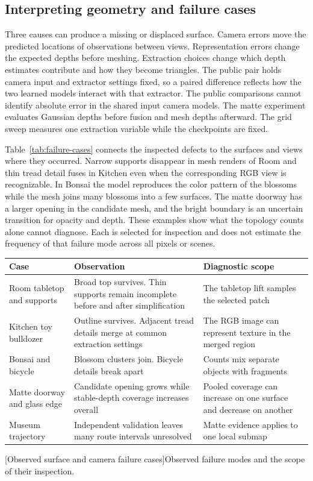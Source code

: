 \subsection{Interpreting geometry and failure cases}
Three causes can produce a missing or displaced surface. Camera errors move the predicted locations of observations between views. Representation errors change the expected depths before meshing. Extraction choices change which depth estimates contribute and how they become triangles. The public pair holds camera input and extractor settings fixed, so a paired difference reflects how the two learned models interact with that extractor. The public comparisons cannot identify absolute error in the shared input camera models. The matte experiment evaluates Gaussian depths before fusion and mesh depths afterward. The grid sweep measures one extraction variable while the checkpoints are fixed.

Table~\ref{tab:failure-cases} connects the inspected defects to the surfaces and views where they occurred. Narrow supports disappear in mesh renders of Room and thin tread detail fuses in Kitchen even when the corresponding RGB view is recognizable. In Bonsai the model reproduces the color pattern of the blossoms while the mesh joins many blossoms into a few surfaces. The matte doorway has a larger opening in the candidate mesh, and the bright boundary is an uncertain transition for opacity and depth. These examples show what the topology counts alone cannot diagnose. Each is selected for inspection and does not estimate the frequency of that failure mode across all pixels or scenes.

\begin{center}\begin{minipage}{\linewidth}
\small\begin{tabularx}{\linewidth}{@{}p{.23\linewidth}YY@{}}
\toprule
\textbf{Case} & \textbf{Observation} & \textbf{Diagnostic scope}\\
\midrule
Room tabletop and supports & Broad top survives. Thin supports remain incomplete before and after simplification & The tabletop lift samples the selected patch\\
Kitchen toy bulldozer & Outline survives. Adjacent tread details merge at common extraction settings & The RGB image can represent texture in the merged region\\
Bonsai and bicycle & Blossom clusters join. Bicycle details break apart & Counts mix separate objects with fragments\\
Matte doorway and glass edge & Candidate opening grows while stable-depth coverage increases overall & Pooled coverage can increase on one surface and decrease on another\\
Museum trajectory & Independent validation leaves many route intervals unresolved & Matte evidence applies to one local submap\\
\bottomrule
\end{tabularx}\par
{}[Observed surface and camera failure cases]{Observed failure modes and the scope of their inspection.}\label{tab:failure-cases}
\end{minipage}\end{center}
